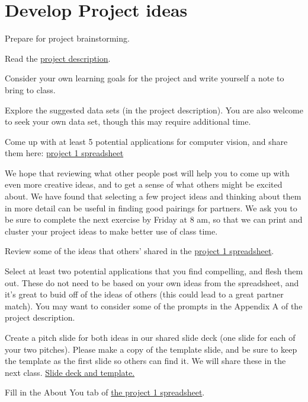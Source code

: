 \documentclass[assignment08_Solutions]{subfiles}
\begin{document}
\section{Develop Project ideas}

\begin{exercise}
Prepare for project brainstorming.
\bes
\item Read the \href{https://github.com/olincollege/MLfall2021/blob/master/Module\%201/m1_project/m1_project.pdf}{project description}.
\item Consider your own learning goals for the project and write yourself a note to bring to class. 
\item Explore the suggested data sets (in the project description). You are also welcome to seek your own data set, though this may require additional time.
\item Come up with at least 5 potential applications for computer vision, and share them here: \href{https://docs.google.com/spreadsheets/d/1TyzKsfdCvZEzfaYswfJSHiYH2JU73gd0KCIOwQijvFo/edit?usp=sharing}{project 1 spreadsheet} 
\ees 
\end{exercise}
 
\vspace{1em}
We hope that reviewing what other people post will help you to come up with even more creative ideas, and to get a sense of what others might be excited about. We have found that selecting a few project ideas and thinking about them in more detail can be useful in finding good pairings for partners. We ask you to be sure to complete the next exercise by Friday at 8 am, so that we can print and cluster your project ideas to make better use of class time.
\vspace{1em}
\begin{exercise}
\bes
\item Review some of the ideas that others' shared in the \href{https://docs.google.com/spreadsheets/d/1TyzKsfdCvZEzfaYswfJSHiYH2JU73gd0KCIOwQijvFo/edit?usp=sharing}{project 1 spreadsheet}. 
\item Select at least two potential applications that you find compelling, and flesh them out. These do not need to be based on your own ideas from the spreadsheet, and it's great to buid off of the ideas of others (this could lead to a great partner match). You may want to consider some of the prompts in the Appendix A of the project description.
\item Create a pitch slide for both ideas in our shared slide deck (one slide for each of your two pitches). Please make a copy of the template slide, and be sure to keep the template as the first slide so others can find it. We will share these in the next class. \href{https://docs.google.com/presentation/d/1f3u9lJXV9_DzKRhHH41kr8h3xQn4ex6SbpcNwyws9z4/edit?usp=sharing}{Slide deck and template.} 
\item Fill in the About You tab of \href{https://docs.google.com/spreadsheets/d/1TyzKsfdCvZEzfaYswfJSHiYH2JU73gd0KCIOwQijvFo/edit?usp=sharing}{the project 1 spreadsheet}.
\ees
\end{exercise}
\end{document}
